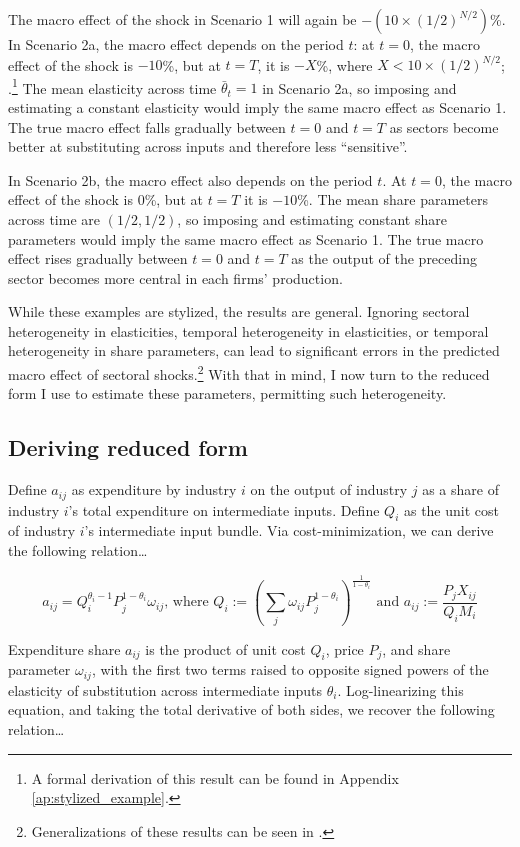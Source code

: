 \documentclass[11pt]{article}
\begin{document}
The macro effect of the shock in Scenario 1 will again be $-(10 \times (1/2)^{N/2})$\%. In Scenario 2a, the macro effect depends on the period $t$: at $t=0$, the macro effect of the shock is $-10$\%, but at $t=T$, it is $-X$\%, where $X < 10 \times (1/2)^{N/2}$; .\footnote{A formal derivation of this result can be found in Appendix \ref{ap:stylized_example}.} The mean elasticity across time $\bar{\theta}_t = 1$ in Scenario 2a, so imposing and estimating a constant elasticity would imply the same macro effect as Scenario 1. The true macro effect falls gradually between $t = 0$ and $t = T$ as sectors become better at substituting across inputs and therefore less ``sensitive''.

In Scenario 2b, the macro effect also depends on the period $t$. At $t=0$, the macro effect of the shock is $0$\%, but at $t = T$ it is $-10$\%. The mean share parameters across time are $(1/2,1/2)$, so imposing and estimating constant share parameters would imply the same macro effect as Scenario 1. The true macro effect rises gradually between $t=0$ and $t=T$ as the output of the preceding sector becomes more central in each firms' production.

While these examples are stylized, the results are general. Ignoring sectoral heterogeneity in elasticities, temporal heterogeneity in elasticities, or temporal heterogeneity in share parameters, can lead to significant errors in the predicted macro effect of sectoral shocks.\footnote{Generalizations of these results can be seen in \citet{baqaeeMacroeconomicImpactMicroeconomic2019}.} With that in mind, I now turn to the reduced form I use to estimate these parameters, permitting such heterogeneity.

\subsection{Deriving reduced form}

Define $a_{ij}$ as expenditure by industry $i$ on the output of industry $j$ as a share of industry $i$'s total expenditure on intermediate inputs. Define $Q_i$ as the unit cost of industry $i$'s  intermediate input bundle. Via cost-minimization, we can derive the following relation\dots

\[ a_{ij} = Q_i^{\theta_i - 1} P_j^{1 - \theta_i} \omega_{ij} \text{, where } Q_i := \left(\sum_j \omega_{ij} P_j^{1-\theta_i}\right)^{\frac{1}{1-\theta_i}} \text{ and } a_{ij} := \frac{P_j X_{ij}}{Q_i M_i} \]

Expenditure share $a_{ij}$ is the product of unit cost $Q_i$, price $P_j$, and share parameter $\omega_{ij}$, with the first two terms raised to opposite signed powers of the elasticity of substitution across intermediate inputs $\theta_i$. Log-linearizing this equation, and taking the total derivative of both sides, we recover the following relation\dots 
\end{document}
